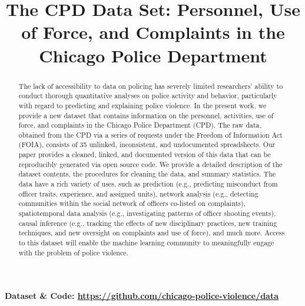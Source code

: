 \documentclass{article}
\title{The CPD Data Set: Personnel, Use of Force, and Complaints in the Chicago Police Department}
\begin{document}
\maketitle

\begin{abstract}
The lack of accessibility to data on policing has severely limited researchers’
ability to conduct thorough quantitative analyses on police activity and
behavior, particularly with regard to predicting and explaining police
violence. In the present work, we provide a new dataset that contains
information on the personnel, activities, use of force, and complaints in the
Chicago Police Department (CPD). The raw data, obtained from the CPD via a
series of requests under the Freedom of Information Act (FOIA), consists of 35
unlinked, inconsistent, and undocumented spreadsheets. Our paper provides a
cleaned, linked, and documented version of this data that can be reproducibly
generated via open source code. We provide a detailed description of the
dataset contents, the procedures for cleaning the data, and summary statistics.
The data have a rich variety of uses, such as prediction (e.g., predicting
misconduct from officer traits, experience, and assigned units), network
analysis (e.g., detecting communities within the social network of officers
co-listed on complaints), spatiotemporal data analysis (e.g., investigating
patterns of officer shooting events), causal inference (e.g., tracking the
effects of new disciplinary practices, new training techniques, and new
oversight on complaints and use of force), and much more. Access to this
dataset will enable the machine learning community to meaningfully engage with
the problem of police violence.
\end{abstract}

\textbf{Dataset \& Code: \url{https://github.com/chicago-police-violence/data}}








%
%






\appendix


\end{document}
